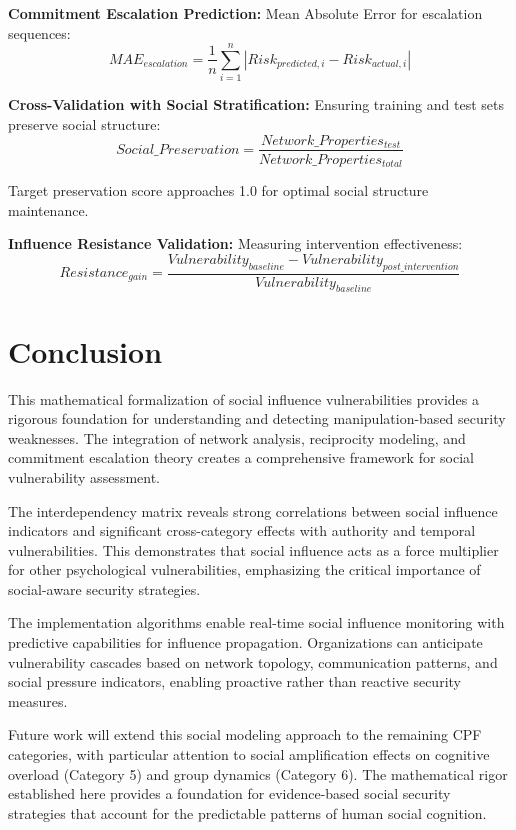 \documentclass[11pt,a4paper]{article}
\begin{document}
\textbf{Commitment Escalation Prediction:}
Mean Absolute Error for escalation sequences:
\begin{equation}
MAE_{escalation} = \frac{1}{n} \sum_{i=1}^{n} |Risk_{predicted,i} - Risk_{actual,i}|
\end{equation}

\textbf{Cross-Validation with Social Stratification:}
Ensuring training and test sets preserve social structure:
\begin{equation}
Social\_Preservation = \frac{Network\_Properties_{test}}{Network\_Properties_{total}}
\end{equation}

Target preservation score approaches 1.0 for optimal social structure maintenance.

\textbf{Influence Resistance Validation:}
Measuring intervention effectiveness:
\begin{equation}
Resistance_{gain} = \frac{Vulnerability_{baseline} - Vulnerability_{post\_intervention}}{Vulnerability_{baseline}}
\end{equation}

\section{Conclusion}

This mathematical formalization of social influence vulnerabilities provides a rigorous foundation for understanding and detecting manipulation-based security weaknesses. The integration of network analysis, reciprocity modeling, and commitment escalation theory creates a comprehensive framework for social vulnerability assessment.

The interdependency matrix reveals strong correlations between social influence indicators and significant cross-category effects with authority and temporal vulnerabilities. This demonstrates that social influence acts as a force multiplier for other psychological vulnerabilities, emphasizing the critical importance of social-aware security strategies.

The implementation algorithms enable real-time social influence monitoring with predictive capabilities for influence propagation. Organizations can anticipate vulnerability cascades based on network topology, communication patterns, and social pressure indicators, enabling proactive rather than reactive security measures.

Future work will extend this social modeling approach to the remaining CPF categories, with particular attention to social amplification effects on cognitive overload (Category 5) and group dynamics (Category 6). The mathematical rigor established here provides a foundation for evidence-based social security strategies that account for the predictable patterns of human social cognition.
\end{document}
